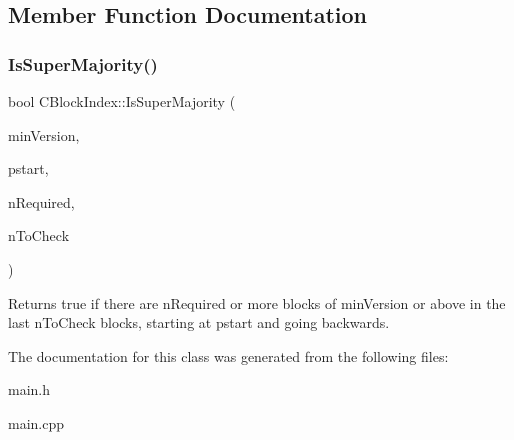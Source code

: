 \subsection{Member Function Documentation}
\mbox{\label{class_c_block_index_a6de57239c4944a5c768ec46830120962}} 
\subsubsection{\texorpdfstring{IsSuperMajority()}{IsSuperMajority()}}
{\footnotesize\ttfamily bool C\+Block\+Index\+::\+Is\+Super\+Majority (\begin{DoxyParamCaption}\item[{int}]{min\+Version,  }\item[{const \mbox{\hyperlink{class_c_block_index}{C\+Block\+Index}} $\ast$}]{pstart,  }\item[{unsigned int}]{n\+Required,  }\item[{unsigned int}]{n\+To\+Check }\end{DoxyParamCaption})\hspace{0.3cm}{\ttfamily [static]}}

Returns true if there are n\+Required or more blocks of min\+Version or above in the last n\+To\+Check blocks, starting at pstart and going backwards. 

The documentation for this class was generated from the following files\+:\begin{DoxyCompactItemize}
\item 
main.\+h\item 
main.\+cpp\end{DoxyCompactItemize}
